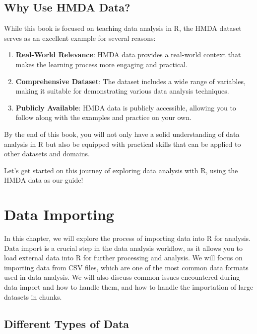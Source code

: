 \documentclass[
]{book}
\providecommand{\tightlist}{%
  \setlength{\itemsep}{0pt}\setlength{\parskip}{0pt}}
\begin{document}
\hypertarget{why-use-hmda-data}{%
\section{Why Use HMDA Data?}\label{why-use-hmda-data}}

While this book is focused on teaching data analysis in R, the HMDA dataset serves as an excellent example for several reasons:

\begin{enumerate}
\def\labelenumi{\arabic{enumi}.}
\tightlist
\item
  \textbf{Real-World Relevance}: HMDA data provides a real-world context that makes the learning process more engaging and practical.
\item
  \textbf{Comprehensive Dataset}: The dataset includes a wide range of variables, making it suitable for demonstrating various data analysis techniques.
\item
  \textbf{Publicly Available}: HMDA data is publicly accessible, allowing you to follow along with the examples and practice on your own.
\end{enumerate}

By the end of this book, you will not only have a solid understanding of data analysis in R but also be equipped with practical skills that can be applied to other datasets and domains.

Let's get started on this journey of exploring data analysis with R, using the HMDA data as our guide!

\hypertarget{data-importing}{%
\chapter{Data Importing}\label{data-importing}}

In this chapter, we will explore the process of importing data into R for analysis. Data import is a crucial step in the data analysis workflow, as it allows you to load external data into R for further processing and analysis. We will focus on importing data from CSV files, which are one of the most common data formats used in data analysis. We will also discuss common issues encountered during data import and how to handle them, and how to handle the importation of large datasets in chunks.

\hypertarget{different-types-of-data}{%
\section{Different Types of Data}\label{different-types-of-data}}
\end{document}
